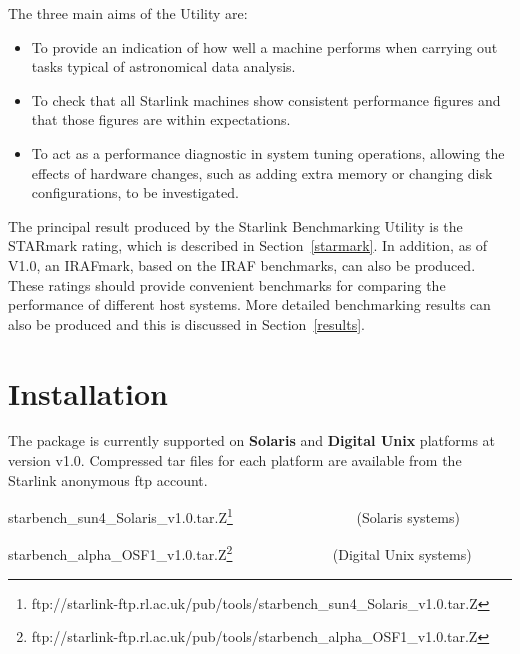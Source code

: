 \documentclass[11pt]{article}
\newcommand{\htmladdnormallinkfoot}[2]{#1\footnote{#2}}
\newcommand{\pkgver}     {v1.0}
\newcommand{\pkgftpdir}  {/pub/tools}
\newcommand{\pkgftpsrv} {starlink-ftp.rl.ac.uk}
\newcommand{\pkgurl} {ftp://\pkgftpsrv\pkgftpdir}
\begin{document}
The three main aims of the Utility are:

\begin{itemize}
\item To provide an indication of how well a machine performs when
carrying out tasks typical of astronomical data analysis.

\item To check that all Starlink machines show consistent performance
figures and that those figures are within expectations.

\item To act as a performance diagnostic in system tuning operations, allowing
the effects of hardware changes, such as adding extra memory or changing
disk configurations, to be investigated.
\end{itemize}

The principal result produced by the Starlink Benchmarking Utility is
the STARmark rating, which is described in Section~\ref{starmark}. In
addition, as of V1.0, an IRAFmark, based on the IRAF benchmarks, can
also be produced. These ratings should provide convenient benchmarks
for comparing the performance of different host systems. More detailed
benchmarking results can also be produced and this is discussed in
Section~\ref{results}.



\section{Installation}

The package is currently supported on {\bf Solaris} and {\bf Digital
Unix} platforms at version \pkgver. Compressed tar files for each
platform are available from the Starlink anonymous ftp account.

\vspace{3mm}
\htmladdnormallinkfoot{starbench\_sun4\_Solaris\_\pkgver.tar.Z}{\pkgurl/starbench\_sun4\_Solaris\_\pkgver.tar.Z} ~~~~~~~~~~~~~~~~~(Solaris systems)

\htmladdnormallinkfoot{starbench\_alpha\_OSF1\_\pkgver.tar.Z}{\pkgurl/starbench\_alpha\_OSF1\_\pkgver.tar.Z} ~~~~~~~~~~~~~ (Digital Unix systems)


\end{document}
